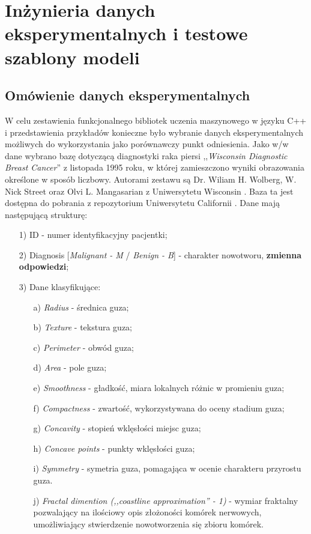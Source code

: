 \chapter{Inżynieria danych eksperymentalnych i testowe szablony modeli}
\section{Omówienie danych eksperymentalnych}
	
	W celu zestawienia funkcjonalnego bibliotek uczenia maszynowego w języku C++ i przedstawienia przykładów konieczne było wybranie danych eksperymentalnych możliwych do wykorzystania jako porównawczy punkt odniesienia. Jako w/w dane wybrano bazę dotyczącą diagnostyki raka piersi ,,\textit{Wisconsin Diagnostic Breast Cancer}'' z listopada 1995 roku, w której zamieszczono wyniki obrazowania określone w sposób liczbowy. Autorami zestawu są Dr. Wiliam H. Wolberg, W. Nick Street oraz Olvi L. Mangasarian z Uniwersytetu Wisconsin \cite{wisconsin}. Baza ta jest dostępna do pobrania z repozytorium Uniwersytetu Californii \cite{Dua:2019}. Dane mają następującą strukturę:
	
	\begin{enumerate}
		\item [1)] ID - numer identyfikacyjny pacjentki;
		\item [2)] Diagnosis [\textit{Malignant - M} / \textit{Benign - B}] - charakter nowotworu, \textbf{zmienna odpowiedzi};
		\item [3)] Dane klasyfikujące:
			\begin{enumerate}
				\item [a)] \textit{Radius} - średnica guza;
				\item [b)] \textit{Texture} - tekstura guza;
				\item [c)] \textit{Perimeter} - obwód guza;
				\item [d)] \textit{Area} - pole guza;
				\item [e)] \textit{Smoothness} - gładkość, miara lokalnych różnic w promieniu guza;
				\item [f)] \textit{Compactness} - zwartość, wykorzystywana do oceny stadium guza;
				\item [g)] \textit{Concavity} - stopień wklęsłości miejsc guza;
				\item [h)] \textit{Concave points} - punkty wklęsłości guza;
				\item [i)] \textit{Symmetry} - symetria guza, pomagająca w ocenie charakteru przyrostu guza.
				\item [j)] \textit{Fractal dimention (,,coastline approximation'' - 1)} - wymiar fraktalny pozwalający na ilościowy opis złożoności komórek nerwowych, umożliwiający stwierdzenie nowotworzenia się zbioru komórek.
			\end{enumerate}
	\end{enumerate}
	
